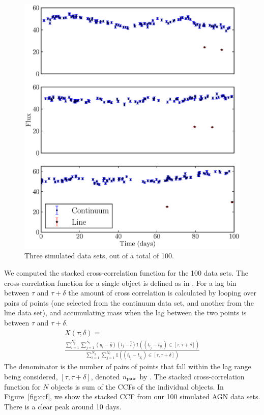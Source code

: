 \documentclass[useAMS,usenatbib]{mn2e}
\begin{document}
\begin{figure}
\begin{center}
\includegraphics[scale=0.5]{Figures/data.eps}
\caption{Three simulated data sets, out of a total of 100.\label{fig:data}}
\end{center}
\end{figure}

We computed the stacked cross-correlation function for the 100 data sets.
The cross-correlation function for a single object is defined as
in \citet{2012MNRAS.427.2701F}. For a lag bin between $\tau$ and $\tau + \delta$
the amount of cross correlation is calculated by looping over pairs of points
(one selected from the continuum data set, and another from the line data set),
and accumulating mass when the lag between the two points is between $\tau$
and $\tau + \delta$.
\begin{eqnarray}
X(\tau; \delta) =\\ \frac{\sum_{i=1}^{N_y}\sum_{j=1}^{N_l}
\left(y_i - \bar{y}\right)
\left(l_j - \bar{l}\right)
\mathds{1}\left((t_{l_j} - t_{y_i}) \in [\tau, \tau + \delta]\right)}
{\sum_{i=1}^{N_y}\sum_{j=1}^{N_l}
\mathds{1}\left((t_{l_j} - t_{y_i}) \in [\tau, \tau + \delta]\right)}
\end{eqnarray}
The denominator is the number of pairs of points that fall within the lag range
being considered, $[\tau, \tau + \delta]$, denoted $n_{\rm pair}$ by
\citet{2012MNRAS.427.2701F}.
The stacked cross-correlation function for $N$ objects is sum of the CCFs
of the individual objects. In Figure~\ref{fig:ccf}, we show the stacked CCF
from our 100 simulated AGN data sets. There is a clear peak around 10 days.
\end{document}
